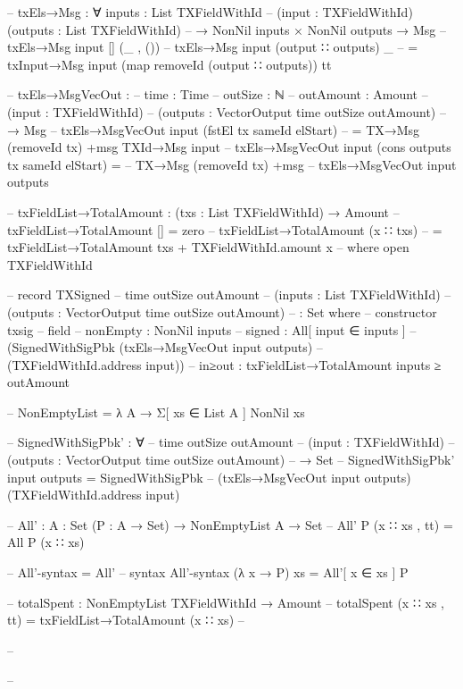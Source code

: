\documentclass{beamer}
\begin{document}
{\begin{code}
--     txEls→Msg : ∀ {inputs : List TXFieldWithId}
--       (input : TXFieldWithId) (outputs : List TXFieldWithId)
--       → NonNil inputs × NonNil outputs → Msg
--     txEls→Msg input [] (_ , ())
--     txEls→Msg input (output ∷ outputs) _
--       = txInput→Msg input (map removeId (output ∷ outputs)) tt

--     txEls→MsgVecOut :
--       {time      : Time}
--       {outSize   : ℕ}
--       {outAmount : Amount}
--       (input     : TXFieldWithId)
--       (outputs   : VectorOutput time outSize outAmount)
--       → Msg
--     txEls→MsgVecOut input (fstEl tx sameId elStart)
--       = TX→Msg (removeId tx) +msg TXId→Msg input
--     txEls→MsgVecOut input (cons outputs tx sameId elStart) =
--       TX→Msg (removeId tx) +msg
--       txEls→MsgVecOut input outputs

--     txFieldList→TotalAmount : (txs : List TXFieldWithId) → Amount
--     txFieldList→TotalAmount [] = zero
--     txFieldList→TotalAmount (x ∷ txs)
--       = txFieldList→TotalAmount txs + TXFieldWithId.amount x
--       where open TXFieldWithId

--     record TXSigned
--       {time} {outSize} {outAmount}
--       (inputs    : List TXFieldWithId)
--       (outputs   : VectorOutput time outSize outAmount)
--         : Set where
--       constructor txsig
--       field
--         nonEmpty : NonNil inputs
--         signed   : All[ input ∈ inputs ]
--           (SignedWithSigPbk (txEls→MsgVecOut input outputs)
--           (TXFieldWithId.address input))
--         in≥out : txFieldList→TotalAmount inputs ≥ outAmount

--     NonEmptyList = λ A → Σ[ xs ∈ List A ] NonNil xs

--     SignedWithSigPbk' : ∀
--       {time} {outSize} {outAmount}
--       (input    : TXFieldWithId)
--       (outputs   : VectorOutput time outSize outAmount)
--       → Set
--     SignedWithSigPbk' input outputs = SignedWithSigPbk
--       (txEls→MsgVecOut input outputs) (TXFieldWithId.address input)

--     All' : {A : Set} (P : A → Set) → NonEmptyList A → Set
--     All' P (x ∷ xs , tt) = All P (x ∷ xs)

--     All'-syntax = All'
--     syntax All'-syntax (λ x → P) xs = All'[ x ∈ xs ] P

--     totalSpent : NonEmptyList TXFieldWithId → Amount
--     totalSpent (x ∷ xs , tt) = txFieldList→TotalAmount (x ∷ xs)
-- \end{code}
-- }
-- %
\end{document}
